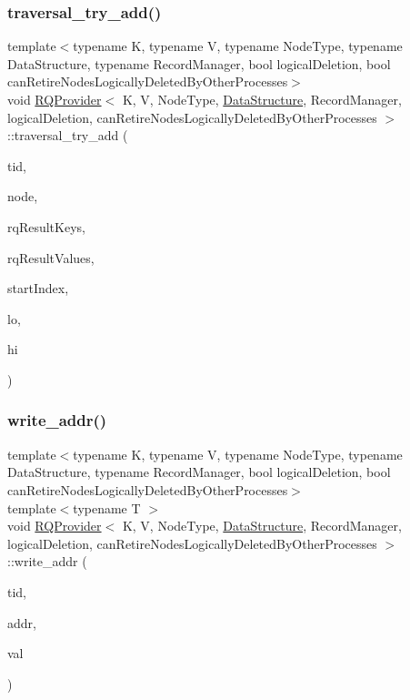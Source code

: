 \subsubsection{\texorpdfstring{traversal\+\_\+try\+\_\+add()}{traversal\_try\_add()}\hspace{0.1cm}{\footnotesize\ttfamily [5/5]}}
{\footnotesize\ttfamily template$<$typename K, typename V, typename Node\+Type, typename Data\+Structure, typename Record\+Manager, bool logical\+Deletion, bool can\+Retire\+Nodes\+Logically\+Deleted\+By\+Other\+Processes$>$ \\
void \hyperlink{classRQProvider}{R\+Q\+Provider}$<$ K, V, Node\+Type, \hyperlink{classDataStructure}{Data\+Structure}, Record\+Manager, logical\+Deletion, can\+Retire\+Nodes\+Logically\+Deleted\+By\+Other\+Processes $>$\+::traversal\+\_\+try\+\_\+add (\begin{DoxyParamCaption}\item[{const int}]{tid,  }\item[{Node\+Type $\ast$const}]{node,  }\item[{K $\ast$const}]{rq\+Result\+Keys,  }\item[{V $\ast$const}]{rq\+Result\+Values,  }\item[{int $\ast$const}]{start\+Index,  }\item[{const K \&}]{lo,  }\item[{const K \&}]{hi }\end{DoxyParamCaption})\hspace{0.3cm}{\ttfamily [inline]}}

\mbox{\label{classRQProvider_a2b627a253e65ffdbba9815d0ac3236cb}} 
\subsubsection{\texorpdfstring{write\+\_\+addr()}{write\_addr()}\hspace{0.1cm}{\footnotesize\ttfamily [1/5]}}
{\footnotesize\ttfamily template$<$typename K, typename V, typename Node\+Type, typename Data\+Structure, typename Record\+Manager, bool logical\+Deletion, bool can\+Retire\+Nodes\+Logically\+Deleted\+By\+Other\+Processes$>$ \\
template$<$typename T $>$ \\
void \hyperlink{classRQProvider}{R\+Q\+Provider}$<$ K, V, Node\+Type, \hyperlink{classDataStructure}{Data\+Structure}, Record\+Manager, logical\+Deletion, can\+Retire\+Nodes\+Logically\+Deleted\+By\+Other\+Processes $>$\+::write\+\_\+addr (\begin{DoxyParamCaption}\item[{const int}]{tid,  }\item[{T volatile $\ast$const}]{addr,  }\item[{const T}]{val }\end{DoxyParamCaption})\hspace{0.3cm}{\ttfamily [inline]}}

